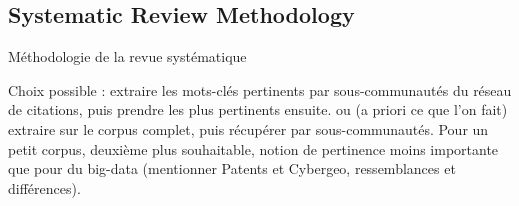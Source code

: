 \label{app:sec:modelography}





\subsection{Systematic Review Methodology}{Méthodologie de la revue systématique}


Choix possible : extraire les mots-clés pertinents par sous-communautés du réseau de citations, puis prendre les plus pertinents ensuite.
ou (a priori ce que l'on fait) extraire sur le corpus complet, puis récupérer par sous-communautés. Pour un petit corpus, deuxième plus souhaitable, notion de pertinence moins importante que pour du big-data (mentionner Patents et Cybergeo, ressemblances et différences).










